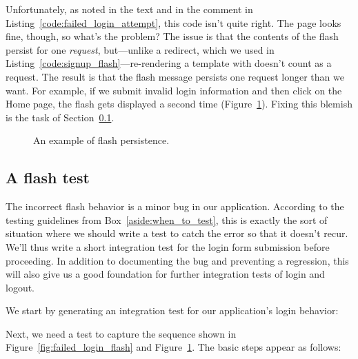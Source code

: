 Unfortunately, as noted in the text and in the comment in Listing~\ref{code:failed_login_attempt}, this code isn't quite right. The page looks fine, though, so what's the problem? The issue is that the contents of the flash persist for one \emph{request}, but---unlike a redirect, which we used in Listing~\ref{code:signup_flash}---re-rendering a template with  doesn't count as a request. The result is that the flash message persists one request longer than we want. For example, if we submit invalid login information and then click on the Home page, the flash gets displayed a second time (Figure~\ref{fig:flash_persistence}). Fixing this blemish is the task of Section~\ref{sec:a_flash_test}.

\begin{figure}
\begin{center}
\end{center}
\caption{An example of flash persistence.\label{fig:flash_persistence}}
\end{figure}



  \subsection{A flash test} %
  \label{sec:a_flash_test}

The incorrect flash behavior is a minor bug in our application. According to the testing guidelines from Box~\ref{aside:when_to_test}, this is exactly the sort of situation where we should write a test to catch the error so that it doesn't recur. We'll thus write a short integration test for the login form submission before proceeding. In addition to documenting the bug and preventing a regression, this will also give us a good foundation for further integration tests of login and logout.

We start by generating an integration test for our application's login behavior:


\noindent Next, we need a test to capture the sequence shown in Figure~\ref{fig:failed_login_flash} and Figure~\ref{fig:flash_persistence}. The basic steps appear as follows:


